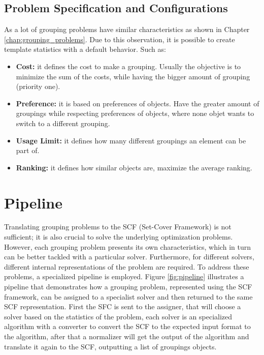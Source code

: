        \subsection{Problem Specification and Configurations}
            As a lot of grouping problems have similar characteristics as shown in Chapter \ref{chap:grouping_problems}. Due to this observation, it is possible to create template statistics with a default behavior. Such as:
            \begin{itemize}
                \item \textbf{Cost:} it defines the cost to make a grouping. Usually the objective is to minimize the sum of the costs, while having the bigger amount of grouping (priority one).
                \item \textbf{Preference:} it is based on preferences of objects. Have the greater amount of groupings while respecting preferences of objects, where none objet wants to switch to a different grouping.
                \item \textbf{Usage Limit:} it defines how many different groupings an element can be part of.
                \item \textbf{Ranking:} it defines how similar objects are, maximize the average ranking.

            \end{itemize}
        
    \section{Pipeline}
    Translating grouping problems to the SCF (Set-Cover Framework) is not sufficient; it is also crucial to solve the underlying optimization problems. 
    However, each grouping problem presents its own characteristics, which in turn can be better tackled with a particular solver.
    Furthermore, for different solvers, different internal representations of the problem are required.
    To address these problems, a specialized pipeline is employed. 
    Figure \ref{fig:pipeline} illustrates a pipeline that demonstrates how a grouping problem, represented using the SCF framework, can be assigned to a specialist solver and then returned to the same SCF representation.
    First the SFC is sent to the assigner, that will choose a solver based on the statistics of the problem, each solver is an specialized algorithm with a converter to convert the SCF to the expected input format to the algorithm, after that a normalizer will get the output of the algorithm and translate it again to the SCF, outputting a list of groupings objects. 


